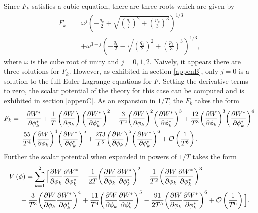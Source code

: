 \documentclass[a4paper,11pt]{article}
\begin{document}
  Since $F_k$ satisfies a cubic equation, there are three roots which are given by
  \begin{equation}
  \begin{split}
    F_k=& \omega^j {\left(-\frac{q_k}{2}+\sqrt{ {\left(\frac{q_k}{2}\right)}^2+{\left(\frac{p_k}{3}\right)}^3}\right)}^{1/3}\\
    &+ \omega^{3-j}{\left(-\frac{q_k}{2}-\sqrt{ {\left(\frac{q_k}{2}\right)}^2+{\left(\frac{p_k}{3}\right)}^3}\right)}^{1/3},
  \end{split}
  \label{auxsolution}
  \end{equation}
  where $\omega$ is the cube root of unity and $j=0,1,2$.
Naively, it appears there are three solutions for $F_k$. However, as exhibited in section \ref{appenB}, only $j = 0$ is a solution to the full Euler-Lagrange equations for $F$.
  Setting the derivative terms to zero, the scalar potential of the theory for this case can be computed
  and is exhibited in section \ref{appenC}. As an expansion in $1/T$, the $F_k$ takes the form
  \begin{equation}
  \begin{split}
    & F_k=-\frac{\partial W^*}{\partial \phi^*_k}+\frac{1}{T} \left(\frac{\partial W}{\partial \phi_k}\right){\left(\frac{\partial W^*}{\partial \phi^*_k}\right)}^2-\frac{3}{T^2} {\left(\frac{\partial W}{\partial \phi_k}\right)}^2{\left(\frac{\partial W^*}{\partial \phi^*_k}\right)}^3+\frac{12}{T^3}{\left(\frac{\partial W}{\partial \phi_k}\right)}^3{\left(\frac{\partial W^*}{\partial \phi^*_k}\right)}^4 \\
    & \indent{}-\frac{55}{T^4}{\left(\frac{\partial W}{\partial \phi_k}\right)}^4{\left(\frac{\partial W^*}{\partial \phi^*_k}\right)}^5+\frac{273}{T^5}{\left(\frac{\partial W}{\partial \phi_k}\right)}^5{\left(\frac{\partial W^*}{\partial \phi^*_k}\right)}^6+\mathcal{O}\left(\frac{1}{T^6}\right).
  \end{split}
  \label{fexpand}
  \end{equation}
  Further the scalar potential when expanded in powers of $1/T$ takes the form
  \begin{equation}
  \begin{split}
    & V\left(\phi \right)=\sum_{k=1}^2\Big[\frac{\partial W}{\partial \phi_k}\frac{\partial W^*}{\partial \phi^*_k}-\frac{1}{2T}{\left(\frac{\partial W}{\partial \phi_k}\frac{\partial W^*}{\partial \phi^*_k}\right)}^2+\frac{1}{T^2}{\left(\frac{\partial W}{\partial \phi_k}\frac{\partial W^*}{\partial \phi^*_k}\right)}^3 \\
    & \indent{}-\frac{3}{T^3}{\left(\frac{\partial W}{\partial \phi_k}\frac{\partial W^*}{\partial \phi^*_k}\right)}^4+\frac{11}{T^4}{\left(\frac{\partial W}{\partial \phi_k}\frac{\partial W^*}{\partial \phi^*_k}\right)}^5-\frac{91}{2T^5}{\left(\frac{\partial W}{\partial \phi_k}\frac{\partial W^*}{\partial \phi^*_k}\right)}^6+\mathcal{O}\left(\frac{1}{T^6}\right)\Big].
  \end{split}
  \label{vexpand}
  \end{equation}
\end{document}
